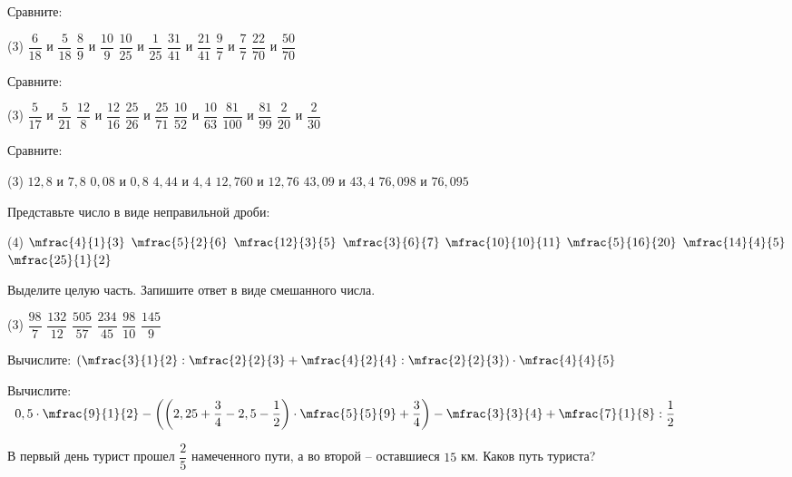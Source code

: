 \begin{class}[number=5]
	\begin{listofex}
		\item Сравните:
		\begin{tasks}(3)
			\task \( \dfrac{6}{18} \) и \( \dfrac{5}{18} \)
			\task \( \dfrac{8}{9} \) и \( \dfrac{10}{9} \)
			\task \( \dfrac{10}{25} \) и \( \dfrac{1}{25} \)
			\task \( \dfrac{31}{41} \) и \( \dfrac{21}{41} \)
			\task \( \dfrac{9}{7} \) и \( \dfrac{7}{7} \)
			\task \( \dfrac{22}{70} \) и \( \dfrac{50}{70} \)
		\end{tasks}
		\item Сравните:
		\begin{tasks}(3)
			\task \( \dfrac{5}{17} \) и \( \dfrac{5}{21} \)
			\task \( \dfrac{12}{8} \) и \( \dfrac{12}{16} \)
			\task \( \dfrac{25}{26} \) и \( \dfrac{25}{71} \)
			\task \( \dfrac{10}{52} \) и \( \dfrac{10}{63} \)
			\task \( \dfrac{81}{100} \) и \( \dfrac{81}{99} \)
			\task \( \dfrac{2}{20} \) и \( \dfrac{2}{30} \)
		\end{tasks}
		\item Сравните: \begin{tasks}(3)
			\task \( 12,8 \) и \( 7,8 \)
			\task \( 0,08 \) и \( 0,8 \)
			\task \( 4,44 \) и \( 4,4 \)
			\task \( 12,760 \) и \( 12,76 \)
			\task \( 43,09 \) и \( 43,4 \)
			\task \( 76,098 \) и \( 76,095 \)
		\end{tasks}
		\item Представьте число в виде неправильной дроби: \begin{tasks}(4)
			\task \( \mfrac{4}{1}{3} \)
			\task \( \mfrac{5}{2}{6} \)
			\task \( \mfrac{12}{3}{5} \)
			\task \( \mfrac{3}{6}{7} \)
			\task \( \mfrac{10}{10}{11} \)
			\task \( \mfrac{5}{16}{20} \)
			\task \( \mfrac{14}{4}{5} \)
			\task \( \mfrac{25}{1}{2} \)
		\end{tasks}
		\item Выделите целую часть. Запишите ответ в виде смешанного числа.
		\begin{tasks}(3)
			\task \( \dfrac{98}{7} \)
			\task \( \dfrac{132}{12} \)
			\task \( \dfrac{505}{57} \)
			\task \( \dfrac{234}{45} \)
			\task \( \dfrac{98}{10} \)
			\task \( \dfrac{145}{9} \)
		\end{tasks}
		\item Вычислите: \quad \( \left( \mfrac{3}{1}{2}:\mfrac{2}{2}{3}+\mfrac{4}{2}{4}:\mfrac{2}{2}{3} \right)\cdot\mfrac{4}{4}{5} \)
		\item Вычислите: \\\ \( 0,5\cdot\mfrac{9}{1}{2}-\left(  \left( 2,25+\dfrac{3}{4}-2,5-\dfrac{1}{2} \right)\cdot\mfrac{5}{5}{9}+\dfrac{3}{4} \right)-\mfrac{3}{3}{4}+\mfrac{7}{1}{8}:\dfrac{1}{2} \)
		\item В первый день турист прошел 
		\( \dfrac{2}{5} \)
		намеченного пути, а во второй – оставшиеся \( 15 \) км. 
		Каков путь туриста?
	\end{listofex}
\end{class}

